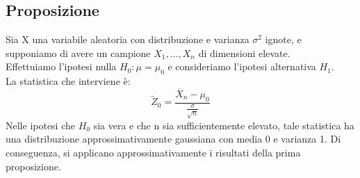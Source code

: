 \documentclass{article}
\begin{document}
\subsection*{Proposizione}
Sia X una variabile aleatoria con distribuzione e varianza $\sigma^{2}$ ignote, e supponiamo di avere un campione $X_{1},...,X_{n}$ di dimensioni elevate.\\
Effettuiamo l'ipotesi nulla $H_{0}: \mu = \mu_{0}$ e consideriamo l'ipotesi alternativa $H_{1}$.\\
La statistica che interviene è:
\[ \widetilde{Z}_{0} = \frac{\overline{X}_{n} - \mu_{0}}{\frac{\sigma}{\sqrt{n}}} \]
Nelle ipotesi che $H_{0}$ sia vera e che n sia sufficientemente elevato, tale statistica ha una distribuzione approssimativamente gaussiana con media 0 e varianza 1. Di conseguenza, si applicano approssimativamente i risultati della prima proposizione.
\end{document}
